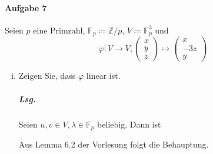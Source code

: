 \documentclass{scrreprt}
\begin{document}
\paragraph{Aufgabe 7} Seien $p$ eine Primzahl,
$\mathbb{F}_p \coloneqq \mathbb{Z}/p$, $V \coloneqq \mathbb{F}_p^3$ und
\[
  \varphi \colon V \to V,
  \begin{pmatrix}x\\y\\z\end{pmatrix} \mapsto
  \begin{pmatrix}x\\-3z\\y\end{pmatrix}
\]
\begin{enumerate}[(i)]
\item Zeigen Sie, dass $\varphi$ linear ist.

  \subparagraph{Lsg.} Seien $u, v \in V, \lambda \in \mathbb{F}_p$
  beliebig.
  Dann ist
  Aus Lemma 6.2 der Vorlesung folgt die Behauptung.


\end{enumerate}
\end{document}
